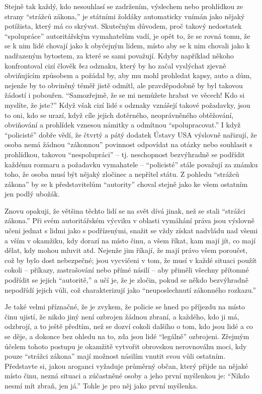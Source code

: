 \documentclass{book}
\begin{document}
Stejně tak každý, kdo nesouhlasí se zadržením, výslechem nebo prohlídkou ze strany \enquote{strážců zákona,} je státními žoldáky automaticky vnímán jako nějaký potížista, který má co skrývat. Skutečným důvodem, proč takový nedostatek \enquote{spolupráce} autoritářským vymahatelům vadí, je opět to, že se rovná tomu, že se k nim lidé chovají jako k obyčejným lidem, místo aby se k nim chovali jako k nadřazeným bytostem, za které se sami považují. Kdyby například někoho konfrontoval cizí člověk \emph{bez} odznaku, který by ho začal vyslýchat zjevně obviňujícím způsobem a požádal by, aby mu mohl prohledat kapsy, auto a dům, nejenže by to obviněný téměř jistě odmítl, ale pravděpodobně by byl takovou žádostí i pobouřen. \enquote{Samozřejmě, že se mi nemůžete hrabat ve věcech! Kdo si myslíte, že jste?} Když však cizí lidé s odznaky vznášejí takové požadavky, jsou to oni, kdo se urazí, když cíle jejich dotěrného, neoprávněného obtěžování, obviňování a prohlídek vznesou námitky a odmítnou \enquote{spolupracovat.} I když \enquote{policisté} dobře vědí, že čtvrtý a pátý dodatek Ústavy USA výslovně nařizují, že osoba nemá žádnou \enquote{zákonnou} povinnost odpovídat na otázky nebo souhlasit s prohlídkou, takovou \enquote{nespolupráci} -- tj. neschopnost bezvýhradně se podřídit každému rozmaru a požadavku vymahatele -- \enquote{policisté} stále považují za známku toho, že osoba musí být nějaký zločinec a nepřítel státu. Z pohledu \enquote{strážců zákona} by se k představitelům \enquote{autority} choval stejně jako ke všem ostatním jen podlý ubožák.

Znovu opakuji, že většina těchto lidí se na svět dívá jinak, než se stali \enquote{strážci zákona.} Při svém autoritářském výcviku v oblasti vymáhání práva jsou výslovně učeni jednat s lidmi jako s podřízenými, snažit se vždy získat nadvládu nad všemi a vším v okamžiku, kdy dorazí na místo činu, a všem říkat, kam mají jít, co mají dělat, kdy mohou mluvit atd. Nejenže jim říkají, že mají právo všem poroučet, což by bylo dost nebezpečné; jsou vycvičeni v tom, že musí v každé situaci použít cokoli -- příkazy, zastrašování nebo přímé násilí -- aby přiměli všechny přítomné podřídit se jejich \enquote{autoritě,} a učí je, že je zločin, pokud se někdo bezvýhradně nepodřídí jejich vůli, což charakterizují jako \enquote{neuposlechnutí zákonného rozkazu.}

Je také velmi příznačné, že je zvykem, že policie se hned po příjezdu na místo činu ujistí, že nikdo jiný není ozbrojen žádnou zbraní, a každého, kdo ji má, odzbrojí, a to ještě předtím, než se dozví cokoli dalšího o tom, kdo jsou lidé a co se děje, a dokonce bez ohledu na to, zda jsou lidé \enquote{legálně} ozbrojeni. Zřejmým účelem tohoto postupu je okamžitě vytvořit obrovskou nerovnováhu moci, kdy pouze \enquote{strážci zákona} mají možnost násilím vnutit svou vůli ostatním. Představte si, jakou aroganci vyžaduje průměrný občan, který přijde na nějaké místo činu, nezná situaci a zúčastněné osoby a jeho první myšlenkou je: \enquote{Nikdo nesmí mít zbraň, jen já.} Tohle je pro něj jako první myšlenka.
\end{document}
